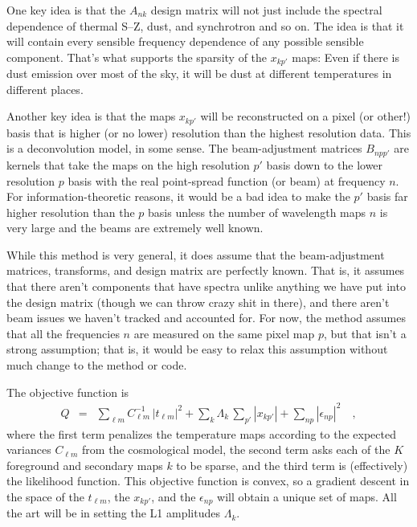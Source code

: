 \documentclass[11pt]{article}
\begin{document}
One key idea is that the $A_{nk}$ design matrix will not just include the
spectral dependence of thermal S--Z, dust, and synchrotron and so
on. The idea is that it will contain every sensible frequency
dependence of any possible sensible component. That's what supports
the sparsity of the $x_{kp'}$ maps: Even if there is dust emission
over most of the sky, it will be dust at different temperatures in
different places.

Another key idea is that the maps $x_{kp'}$ will be reconstructed on a
pixel (or other!) basis that is higher (or no lower) resolution than
the highest resolution data. This is a deconvolution model, in some
sense.  The beam-adjust\-ment matrices $B_{npp'}$ are kernels that take
the maps on the high resolution $p'$ basis down to the lower
resolution $p$ basis with the real point-spread function (or beam) at
frequency $n$. For information-theoretic reasons, it would be a bad
idea to make the $p'$ basis far higher resolution than the $p$ basis
unless the number of wavelength maps $n$ is very large and the beams
are extremely well known.

While this method is very general, it does assume that the
beam-adjust\-ment matrices, transforms, and design matrix are perfectly
known. That is, it assumes that there aren't components that have
spectra unlike anything we have put into the design matrix (though we
can throw crazy shit in there), and there aren't beam issues we
haven't tracked and accounted for. For now, the method assumes that
all the frequencies $n$ are measured on the same pixel map $p$, but
that isn't a strong assumption; that is, it would be easy to relax
this assumption without much change to the method or code.

The objective function is
\begin{eqnarray}
  Q &=&
    \sum_{\ell m} C_{\ell m}^{-1}\,|t_{\ell m}|^2
  + \sum_{k} \Lambda_k\,\sum_{p'} |x_{kp'}|
  + \sum_{np} |\epsilon_{np}|^2 \quad ,
\end{eqnarray}
where the first term penalizes the temperature maps according to the
expected variances $C_{\ell m}$ from the cosmological model, the
second term asks each of the $K$ foreground and secondary maps $k$ to
be sparse, and the third term is (effectively) the likelihood
function.
This objective function is convex, so a gradient descent in the space
of the $t_{\ell m}$, the $x_{kp'}$, and the $\epsilon_{np}$ will
obtain a unique set of maps.
All the art will be in setting the L1 amplitudes $\Lambda_k$.
\end{document}
